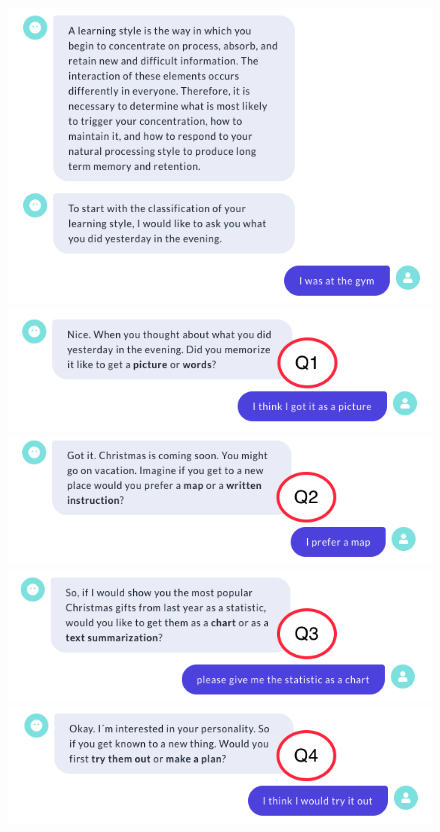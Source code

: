   \begin{figure}[H]
    \centering
    \includegraphics[width=0.7\linewidth]{images/Talk_roterMarker/T0.3.PNG}
    \includegraphics[width=0.7\linewidth]{images/Talk_roterMarker/T1.PNG}
    \includegraphics[width=0.7\linewidth]{images/Talk_roterMarker/T2.png}
    \includegraphics[width=0.7\linewidth]{images/Talk_roterMarker/T3.png}
    \includegraphics[width=0.7\linewidth]{images/Talk_roterMarker/T4.png}
    \label{fig:GesprächI}
\end{figure} 
